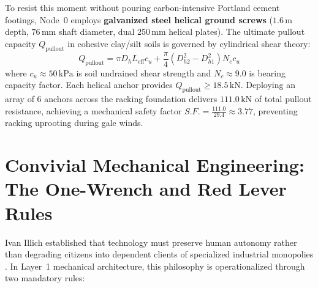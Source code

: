 To resist this moment without pouring carbon-intensive Portland cement footings, Node~0 employs \textbf{galvanized steel helical ground screws} ($1.6\,\mathrm{m}$ depth, $76\,\mathrm{mm}$ shaft diameter, dual $250\,\mathrm{mm}$ helical plates). The ultimate pullout capacity $Q_{\mathrm{pullout}}$ in cohesive clay/silt soils is governed by cylindrical shear theory:
\begin{equation}
Q_{\mathrm{pullout}} = \pi D_h L_{\mathrm{eff}} c_u + \frac{\pi}{4} \left(D_{h2}^2 - D_{h1}^2\right) N_c c_u
\label{eq:helical_pullout}
\end{equation}
where $c_u \approx 50\,\mathrm{kPa}$ is soil undrained shear strength and $N_c \approx 9.0$ is bearing capacity factor. Each helical anchor provides $Q_{\mathrm{pullout}} \ge 18.5\,\mathrm{kN}$. Deploying an array of 6 anchors across the racking foundation delivers $111.0\,\mathrm{kN}$ of total pullout resistance, achieving a mechanical safety factor $S.F. = \frac{111.0}{29.4} \approx 3.77$, preventing racking uprooting during gale winds.

\section{Convivial Mechanical Engineering: The One-Wrench and Red Lever Rules}
\label{sec:mech_convivial}

Ivan Illich established that technology must preserve human autonomy rather than degrading citizens into dependent clients of specialized industrial monopolies \cite{illich1973conviviality}. In Layer~1 mechanical architecture, this philosophy is operationalized through two mandatory rules:

